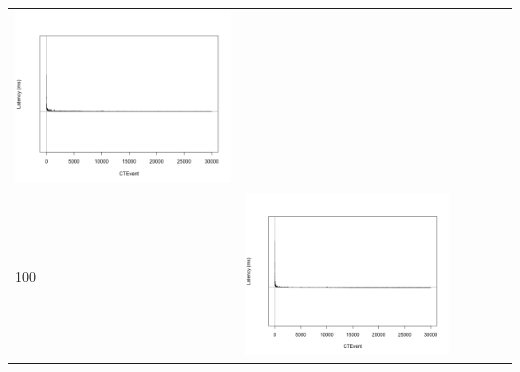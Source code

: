 \begin{table}[htbp]
{\begin{tabular}{l | ccccc}
\begin{minipage}{.15\textwidth}
				\vspace{2pt}
     			 	\includegraphics[width=\linewidth]{images/lat-log-graph/N6}
    				 \end{minipage}\\		
		100	   & \begin{minipage}{.15\textwidth}
     			 	
				\vspace{2pt}
     			 	\includegraphics[width=\linewidth]{images/lat-log-graph/N3}
    				 \end{minipage}
    			   & \begin{minipage}{.15\textwidth}
     			 	

\end{minipage}
\end{tabular}}
\end{table}
